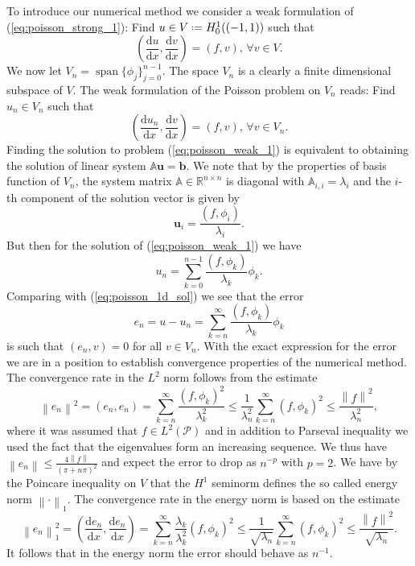 \documentclass[a4paper,10pt]{article}
\newcommand{\R}{\ensuremath{\mathbb{R}}}
\newcommand{\norm}[1]{\ensuremath{\left\|#1\right\|}}
\newcommand{\inner}[2]{\ensuremath{\left(#1, #2\right)}}
\newcommand{\deriv}[2]{\ensuremath{\frac{\mathrm{d}#1}{\mathrm{d}#2}}}
\newcommand*{\defeq}{\mathrel{\vcenter{\baselineskip0.5ex \lineskiplimit0pt
                     \hbox{\scriptsize.}\hbox{\scriptsize.}}}%
                     =}
\DeclareMathOperator{\spn}{span}
\begin{document}
  To introduce our numerical method we consider a weak formulation of
  (\ref{eq:poisson_strong_1}): Find $u\in V\defeq H^1_0((-1, 1))$ such that
  \[
    \inner{\deriv{u}{x}}{\deriv{v}{x}} = \inner{f}{v},\,\forall v\in V.
  \]
  We now let $V_n=\spn\{\phi_j\}_{j=0}^{n-1}$. The space $V_n$
  is a clearly a finite dimensional subspace of $V$. The weak formulation of
  the Poisson problem on $V_n$ reads: Find $u_n\in V_n$ such that
  \begin{equation}
    \label{eq:poisson_weak_1}
    \inner{\deriv{u_n}{x}}{\deriv{v}{x}} = \inner{f}{v},\,\forall v\in V_n.
  \end{equation}
  Finding the solution to problem (\ref{eq:poisson_weak_1}) is equivalent to
  obtaining the solution of linear system $\mathbb{A}\mathbf{u}=\mathbf{b}$.
  We note that by the properties of basis function of $V_n$, the system matrix
  $\mathbb{A}\in\R^{n\times n}$ is diagonal with $\mathbb{A}_{i, i}=\lambda_i$
  and the $i$-th component of the solution vector is given by
  \[
    \mathbf{u}_i = \frac{\inner{f}{\phi_i}}{\lambda_i}.
  \]
  But then for the solution of (\ref{eq:poisson_weak_1}) we have
  \[
    u_n = \sum_{k=0}^{n-1} \frac{\inner{f}{\phi_k}}{\lambda_k} \phi_k.
  \]
  Comparing with (\ref{eq:poisson_1d_sol}) we see that the error
  \[
    e_n=u-u_n = \sum_{k=n}^{\infty} \frac{\inner{f}{\phi_k}}{\lambda_k} \phi_k
  \]
  is such that $(e_n, v)=0$ for all $v\in V_n$. With the exact expression for the
  error we are in a position to establish convergence properties of the
  numerical method. The convergence rate in the $L^2$ norm follows from the
  estimate
  \[
    \norm{e_n}^2=\inner{e_n}{e_n} = \sum_{k=n}^{\infty} \frac{\inner{f}{\phi_k}^2}{\lambda^2_k} \leq
    \frac{1}{\lambda^2_n}\sum_{k=n}^{\infty} \inner{f}{\phi_k}^2 \leq
    \frac{\norm{f}^2}{\lambda^2_n},
  \]
  where it was assumed that $f\in L^2\left(\mathcal{P}\right)$ and in addition
  to Parseval inequality we used the fact that the eigenvalues form an
  increasing sequence. We thus have $\norm{e_n}\leq\frac{4\norm{f}}{\left(\pi +
  n\pi\right)^2}$ and expect the error to drop as
  $n^{-p}$ with $p=2$. We have by the Poincare inequality on $V$ that the $H^1$ seminorm
  defines the so called energy norm $\norm{\cdot}_1$. The convergence rate in
  the energy norm is based on the estimate
  \[
    \norm{e_n}^2_1=\inner{\deriv{e_n}{x}}{\deriv{e_n}{x}} =
    \sum_{k=n}^{\infty} \frac{\lambda_k}{\lambda^2_k}(f, \phi_k)^2 \leq
    \frac{1}{\sqrt{\lambda_n}}\sum_{k=n}^{\infty} (f, \phi_k)^2 \leq
    \frac{\norm{f}^2}{\sqrt{\lambda_n}}.
  \]
  It follows that in the energy norm the error should behave as $n^{-1}$.
\end{document}
